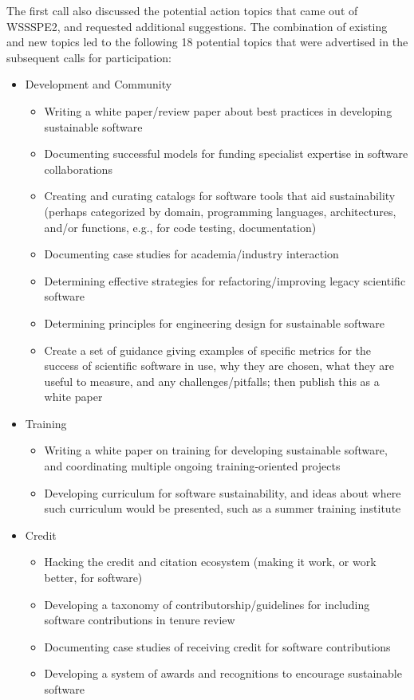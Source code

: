 \documentclass[11pt, oneside]{amsart}
\begin{document}
The first call also discussed the potential action topics that came out of
WSSSPE2, and requested additional suggestions. The combination of existing and
new topics led to the following 18 potential topics that were advertised in the
subsequent calls for participation:
%
\begin{itemize}
\renewcommand{\labelenumi}{\textbf{\theenumi}.}
\setlength{\rightmargin}{1em}

\item Development and Community
\begin{itemize}
\item Writing a white paper/review paper about best practices in developing
sustainable software
\item Documenting successful models for funding specialist expertise in software
collaborations
\item Creating and curating catalogs for software tools that aid sustainability
(perhaps categorized by domain, programming languages, architectures, and/or
functions, e.g., for code testing, documentation)
\item Documenting case studies for academia/industry interaction
\item Determining effective strategies for refactoring/improving legacy
scientific software
\item Determining principles for engineering design for sustainable software
\item Create a set of guidance giving examples of specific metrics for the
success of scientific software in use, why they are chosen, what they are
useful to measure, and any challenges/pitfalls; then publish this as a white
paper
\end{itemize}

\item Training
\begin{itemize}
\item Writing a white paper on training for developing sustainable software, and
coordinating multiple ongoing training-oriented projects
\item Developing curriculum for software sustainability, and ideas about where
such curriculum would be presented, such as a summer training institute
\end{itemize}

\item Credit
\begin{itemize}
\item Hacking the credit and citation ecosystem (making it work, or work better,
for software)
\item Developing a taxonomy of contributorship/guidelines for including software
contributions in tenure review
\item Documenting case studies of receiving credit for software contributions
\item Developing a system of awards and recognitions to encourage sustainable
software
\end{itemize}


\end{itemize}
\end{document}
